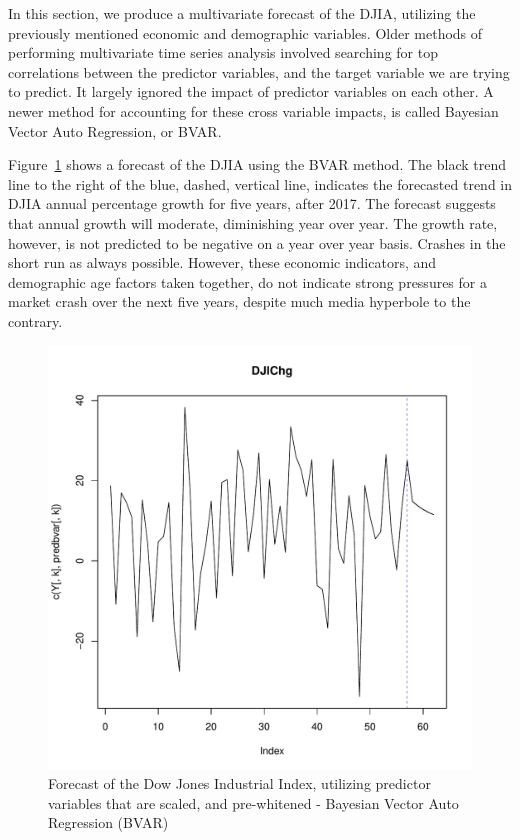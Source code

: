 \documentclass[12pt]{article}         %
\begin{document}
In this section, we produce a multivariate forecast of the DJIA, utilizing the previously mentioned economic and demographic variables.  Older methods of performing multivariate time series analysis involved searching for top correlations between the predictor variables, and the target variable we are trying to predict.  It largely ignored the impact of predictor variables on each other.  A newer method for accounting for these cross variable impacts, is called Bayesian Vector Auto Regression, or BVAR.

Figure~\ref{fig:BVARForecast} shows a forecast of the DJIA using the BVAR method.  The black trend line to the right of the blue, dashed, vertical line, indicates the forecasted trend in DJIA annual percentage growth for five years, after 2017.  The forecast suggests that annual growth will moderate, diminishing year over year.  The growth rate, however, is not predicted to be negative on a year over year basis.  Crashes in the short run as always possible.  However, these economic indicators, and demographic age factors taken together, do not indicate strong pressures for a market crash over the next five years, despite much media hyperbole to the contrary.

\begin{figure}[h!]
\begin{center}
\includegraphics[width=\linewidth]{plots/DJIChg_forecast.pdf}
\caption{Forecast of the Dow Jones Industrial Index, utilizing predictor variables that are scaled, and pre-whitened - Bayesian Vector Auto Regression (BVAR)}
\label{fig:BVARForecast}
\end{center}
\end{figure}
\end{document}
